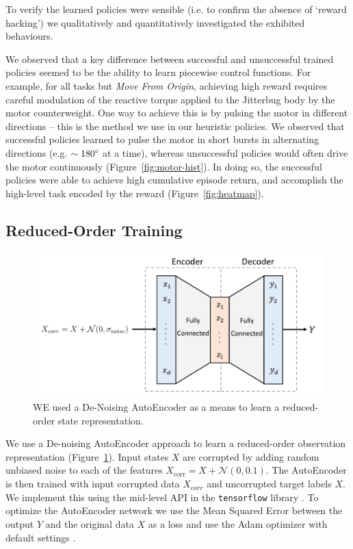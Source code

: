 \documentclass[letterpaper, 10 pt, conference]{ieeeconf}
\begin{document}
To verify the learned policies were sensible (i.e. to confirm the absence of `reward hacking') we qualitatively and quantitatively investigated the exhibited behaviours.

We observed that a key difference between successful and unsuccessful trained policies seemed to be the ability to learn piecewise control functions.
For example, for all tasks but \emph{Move From Origin}, achieving high reward requires careful modulation of the reactive torque applied to the Jitterbug body by the motor counterweight.
One way to achieve this is by pulsing the motor in different directions -- this is the method we use in our heuristic policies.
We observed that successful policies learned to pulse the motor in short bursts in alternating directions (e.g. $\sim180\degree$ at a time), whereas unsuccessful policies would often drive the motor continuously (Figure~\ref{fig:motor-hist}).
In doing so, the successful policies were able to achieve high cumulative episode return, and accomplish the high-level task encoded by the reward (Figure~\ref{fig:heatmap}).

\subsection{Reduced-Order Training}

\begin{figure}[t]
    \centering
    \includegraphics[width=\linewidth]{fig-autoencoder}
    \caption{
        WE used a De-Noising AutoEncoder as a means to learn a reduced-order state representation.
    }
    \label{fig:autoencoder}
\end{figure}

We use a De-noising AutoEncoder approach to learn a reduced-order observation representation (Figure~\ref{fig:autoencoder}).
Input states $X$ are corrupted by adding random unbiased noise to each of the features $X_\text{corr} = X + \mathcal{N}(0, 0.1)$.
The AutoEncoder is then trained with input corrupted data $X_{corr}$ and uncorrupted target labels $X$.
We implement this using the mid-level API in the \texttt{tensorflow} library \cite{Abadi2015Tensorflow}.
To optimize the AutoEncoder network we use the Mean Squared Error between the output $Y$ and the original data $X$ as a loss and use the Adam optimizer with default settings \cite{Adam}.
\end{document}
